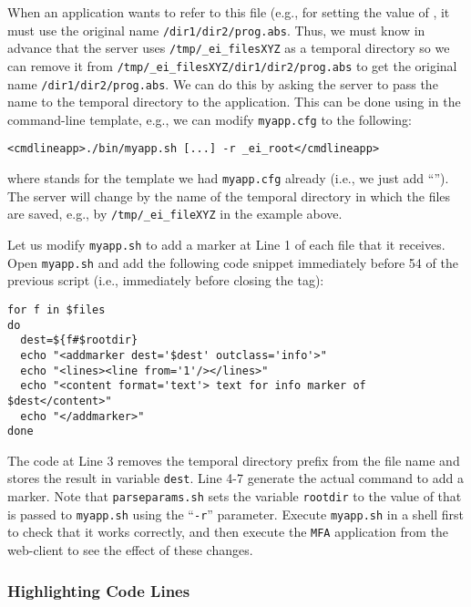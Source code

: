When an application wants to refer to this file (e.g., for setting the
value of , it must use the original name
\texttt{/dir1/dir2/prog.abs}.
%
Thus, we must know in advance that the server uses
\texttt{/tmp/\_ei\_filesXYZ} as a temporal directory so we can remove
it from \texttt{/tmp/\_ei\_filesXYZ/dir1/dir2/prog.abs} to get the
original name \texttt{/dir1/dir2/prog.abs}. 
%
We can do this by asking the server to pass the name to the temporal
directory to the application. This can be done using  in
the command-line template, e.g., we can modify \texttt{myapp.cfg} to
the following:

\medskip
\begin{lstlisting}
<cmdlineapp>./bin/myapp.sh [...] -r _ei_root</cmdlineapp>
\end{lstlisting}

\medskip
\noindent
where \lst{[...]} stands for the template we had \texttt{myapp.cfg}
already (i.e., we just add ``'').
%
The server will change  by the name of the temporal
directory in which the files are saved, e.g., by
\texttt{/tmp/\_ei\_fileXYZ} in the example above.

Let us modify \texttt{myapp.sh} to add a marker at Line 1 of each file
that it receives. Open \texttt{myapp.sh} and add the following code
snippet immediately before 54 of the previous script (i.e.,
immediately before closing the  tag):

\medskip
\begin{lstlisting}[style=script]
for f in $files 
do
  dest=${f#$rootdir}
  echo "<addmarker dest='$dest' outclass='info'>"
  echo "<lines><line from='1'/></lines>"
  echo "<content format='text'> text for info marker of $dest</content>"
  echo "</addmarker>"
done
\end{lstlisting}

\medskip
\noindent
The code at Line 3 removes the temporal directory prefix from the file
name and stores the result in variable \texttt{dest}. Line 4-7
generate the actual command to add a marker.
%
Note that \texttt{parseparams.sh} sets the variable \texttt{rootdir}
to the value of  that is passed to \texttt{myapp.sh}
using the ``\texttt{-r}'' parameter.
%
Execute \texttt{myapp.sh} in a shell first to check that it works
correctly, and then execute the \texttt{MFA} application from the
web-client to see the effect of these changes.

\subsubsection{Highlighting Code Lines}

